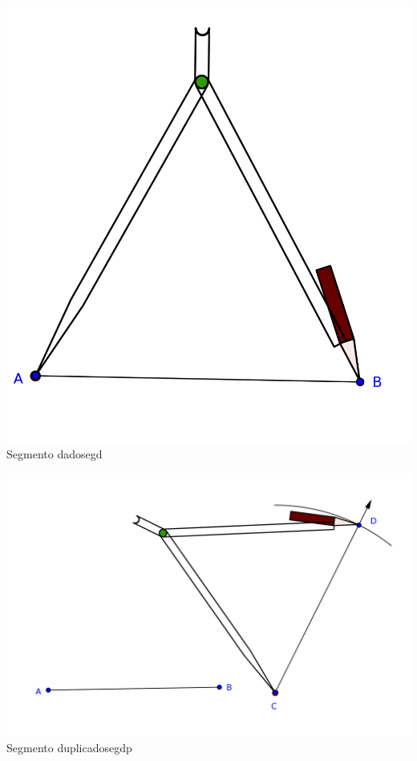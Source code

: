 \documentclass[12pt]{book}
\begin{document}
 \begin{figura}{
 \includegraphics[scale=0.4]{./compas1.png}
}{Segmento dado}{segd}
 \end{figura}
\hfill
 \begin{figura}{
 \includegraphics[scale=0.4]{./compas2.png}
}{Segmento duplicado}{segdp}
\end{figura}
\end{document}
